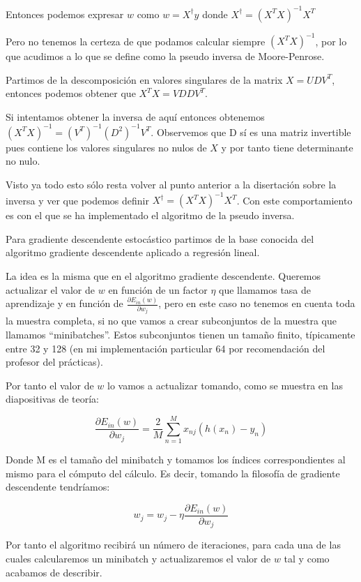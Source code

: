 \documentclass[12pt,a4paper]{article}
\begin{document}
Entonces podemos expresar $w$ como $w = X^{\dagger}y$ donde $X^{\dagger} = (X^T X)^{-1}X^T$

Pero no tenemos la certeza de que podamos calcular siempre $(X^T X)^{-1}$, por lo que acudimos a lo que se define como la pseudo inversa de Moore-Penrose.

Partimos de la descomposición en valores singulares de la matrix $X = UDV^T$, entonces podemos obtener que $X^TX = VDDV^T$.

Si intentamos obtener la inversa de aquí entonces obtenemos $(X^TX)^{-1} = (V^T)^{-1}(D^2)^{-1}V^T$. Observemos que D sí es una matriz invertible pues contiene los valores singulares no nulos de $X$ y por tanto tiene determinante no nulo.

Visto ya todo esto sólo resta volver al punto anterior a la disertación sobre la inversa y ver que podemos definir $X^{\dagger} = (X^T X)^{-1}X^T$. Con este comportamiento es con el que se ha implementado el algoritmo de la pseudo inversa.

Para gradiente descendente estocástico partimos de la base conocida del algoritmo gradiente descendente aplicado a regresión lineal.

La idea es la misma que en el algoritmo gradiente descendente. Queremos actualizar el valor de $w$ en función de un factor $\eta$ que llamamos tasa de aprendizaje y en función de $\frac{\partial E_{in}(w)}{\partial w_j}$, pero en este caso no tenemos en cuenta toda la muestra completa, si no que vamos a crear subconjuntos de la muestra que llamamos ``minibatches''. Estos subconjuntos tienen un tamaño finito, típicamente entre 32 y 128 (en mi implementación particular 64 por recomendación del profesor del prácticas).

Por tanto el valor de $w$ lo vamos a actualizar tomando, como se muestra en las diapositivas de teoría:

$$\frac{\partial E_{in}(w)}{\partial w_j} = \frac{2}{M}\sum_{n=1}^{M}x_{nj}(h(x_n)-y_n)$$

Donde M es el tamaño del minibatch y tomamos los índices correspondientes al mismo para el cómputo del cálculo. Es decir, tomando la filosofía de gradiente descendente tendríamos:

$$w_j = w_j - \eta \frac{\partial E_{in}(w)}{\partial w_j}$$

Por tanto el algoritmo recibirá un número de iteraciones, para cada una de las cuales calcularemos un minibatch y actualizaremos el valor de $w$ tal y como acabamos de describir.
\end{document}
